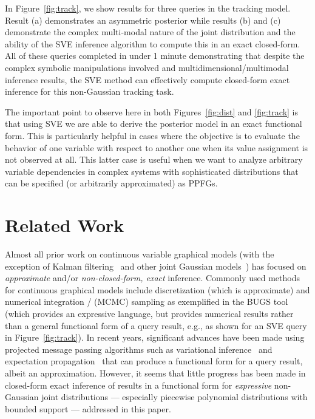 \documentclass[letterpaper]{article}
\begin{document}
{In Figure~\ref{fig:track}, we show results for three queries in the
{tracking} model.  Result (a) demonstrates an asymmetric posterior
while results (b) and (c) demonstrate the
complex multi-modal nature of the joint distribution and the ability of the
SVE inference algorithm to compute this in an exact closed-form.  All
of these queries completed in under 1 minute demonstrating that
despite the complex symbolic manipulations involved and 
multidimensional/multimodal inference results, the SVE method
can effectively compute closed-form exact inference for this non-Gaussian
tracking task.

The important point to observe here in both 
Figures~\ref{fig:dist} and \ref{fig:track} is that using SVE we are
able to derive the posterior model in an exact functional form.  This
is particularly helpful in cases where the objective is to evaluate
the behavior of one variable with respect to another one when its
value assignment is not observed at all.  
This latter case is useful when we want 
to analyze arbitrary variable dependencies in 
complex systems with sophisticated distributions that
can be specified (or arbitrarily approximated) as PPFGs.



\section{Related Work}


Almost all prior work on continuous variable graphical models (with
the exception of Kalman filtering~\cite{kalman_filter} and other joint
Gaussian models~\cite{Weiss99correctnesof}) has focused on
\emph{approximate} and/or \emph{non-closed-form, exact} inference.
Commonly used methods for continuous graphical models include
discretization (which is approximate) and numerical integration /
(MCMC) sampling as exemplified in the BUGS tool~\cite{bugs} (which
provides an expressive language, but provides numerical results rather
than a general functional form of a query result, e.g., as shown for
an SVE query in Figure~\ref{fig:track}).  In recent years, significant
advances have been made using projected message passing algorithms
such as variational inference~\cite{variational} and expectation
propagation~\cite{minka_ep} that can produce a functional form for a
query result, albeit an approximation.  However, it seems that little
progress has been made in {closed-form exact} inference of
results in a functional form for \emph{expressive} non-Gaussian joint
distributions --- especially piecewise polynomial distributions with
bounded support --- addressed in this paper.

}
\end{document}
